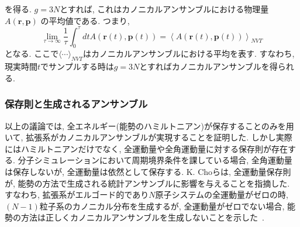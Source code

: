 を得る. $g=3N$とすれば, これはカノニカルアンサンブルにおける物理量$A(\bm{r}, \bm{p})$
の平均値である.
つまり,
\begin{equation}
 \lim_{\tau \to \infty} \frac{1}{\tau}
 \int_{0}^{\tau} dt A \left(\bm{r}(t), \bm{p}(t)\right)
 =
 \left\langle A \left(\bm{r}(t), \bm{p}(t)\right) \right\rangle_{NVT}
 \label{eq:NoseHoover26}
\end{equation}
となる. ここで$\langle \cdots \rangle_{NVT}$はカノニカルアンサンブルにおける平均を表す.
すなわち, 現実時間$t$でサンプルする時は$g=3N$とすればカノニカルアンサンブルを得られる.

\subsubsection{保存則と生成されるアンサンブル}
以上の議論では, 全エネルギー(能勢のハミルトニアン)が保存することのみを用いて, 拡張系がカノニカルアンサンブルが実現することを証明した. 
しかし実際にはハミルトニアンだけでなく, 全運動量や全角運動量に対する保存則が存在する. 
分子シミュレーションにおいて周期境界条件を課している場合, 全角運動量は保存しないが, 全運動量は依然として保存する. 
K. Choらは, 全運動量保存則が, 能勢の方法で生成される統計アンサンブルに影響を与えることを指摘した. 
すなわち, 拡張系がエルゴード的であり$N$原子システムの全運動量がゼロの時, $(N-1)$粒子系のカノニカル分布を生成するが, 全運動量がゼロでない場合, 能勢の方法は正しくカノニカルアンサンブルを生成しないことを示した~\cite{Cho1993}. 

